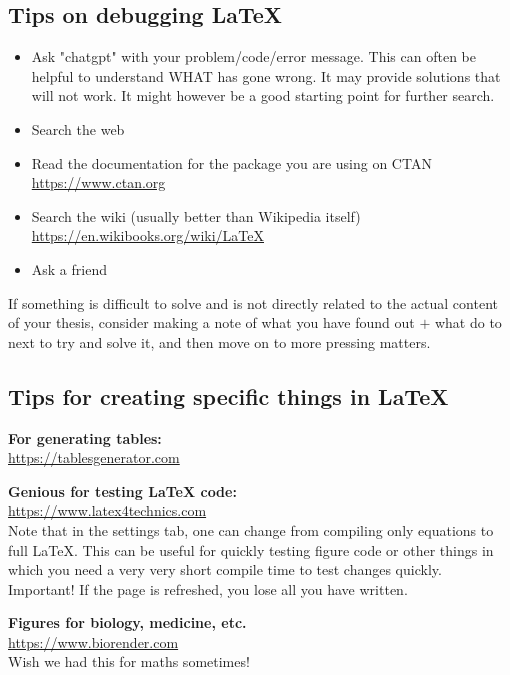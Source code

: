 \documentclass[../thesis.tex]{subfiles}
\begin{document}
\subsection{Tips on debugging \LaTeX}
\begin{itemize}
    \item Ask "chatgpt" with your problem/code/error message. This can often be helpful to understand WHAT has gone wrong. It may provide solutions that will not work. It might however be a good starting point for further search.
    \item Search the web
    \item Read the documentation for the package you are using on CTAN \url{https://www.ctan.org}
    \item Search the wiki (usually better than Wikipedia itself) \url{https://en.wikibooks.org/wiki/LaTeX}
    \item Ask a friend
\end{itemize}
If something is difficult to solve and is not directly related to the actual content of your thesis, consider making a note of what you have found out $+$ what do to next to try and solve it, and then move on to more pressing matters. 


\subsection{Tips for creating specific things in \LaTeX}
\textbf{For generating tables:}\\
\url{https://tablesgenerator.com}


\textbf{Genious for testing LaTeX code:}\\
\url{https://www.latex4technics.com}\\
Note that in the settings tab, one can change from compiling only equations to full \LaTeX. This can be useful for quickly testing figure code or other things in which you need a very very short compile time to test changes quickly. 
Important! If the page is refreshed, you lose all you have written. 


\textbf{Figures for biology, medicine, etc.}\\
\url{https://www.biorender.com}\\
Wish we had this for maths sometimes!
\end{document}
